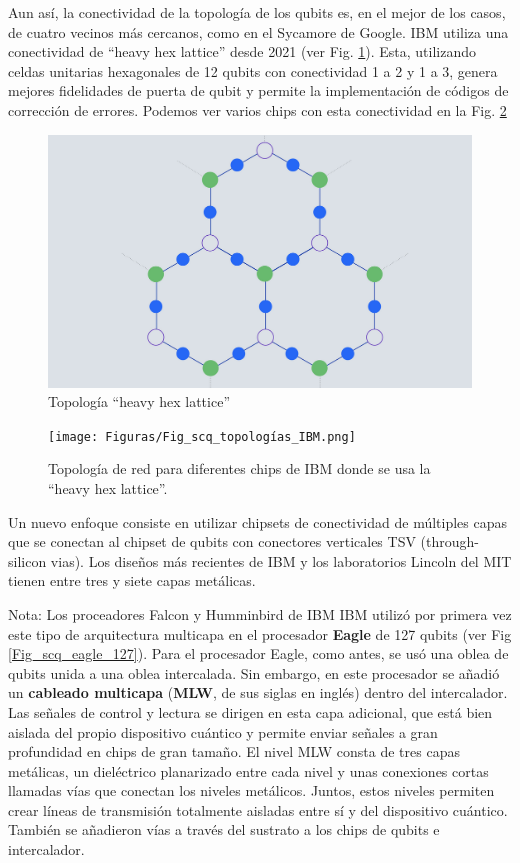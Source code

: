 Aun así, la conectividad de la topología de los qubits es, en el mejor de los casos, de cuatro vecinos más cercanos, como en el Sycamore de Google. IBM utiliza una conectividad de ``heavy hex lattice'' desde 2021 (ver Fig. \ref{Fig_scq_hhl}). Esta, utilizando celdas unitarias hexagonales de 12 qubits con conectividad 1 a 2 y 1 a 3, genera mejores fidelidades de puerta de qubit y permite la implementación de códigos de corrección de errores. Podemos ver varios chips con esta conectividad en la Fig. \ref{Fig_scq_topologías_IBM}

	\begin{figure}[h!]
	\centering 
	\includegraphics[width=0.45\linewidth]{Figuras/Fig_scq_hhl.png}
	\caption{Topología ``heavy hex lattice''}
	\label{Fig_scq_hhl}
	\end{figure}


	\begin{figure}[H]
	\centering 
	\texttt{[image: Figuras/Fig\_scq\_topologías\_IBM.png]}
	\caption{Topología de red para diferentes chips de IBM donde se usa la ``heavy hex lattice''. }
	\label{Fig_scq_topologías_IBM}
	\end{figure}


Un nuevo enfoque consiste en utilizar chipsets de conectividad de múltiples capas que se conectan al chipset de qubits con conectores verticales TSV (through-silicon vias). Los diseños más recientes de IBM y los laboratorios Lincoln del MIT tienen entre tres y siete capas metálicas. 



\begin{mybox_blue}{Nota: Los proceadores Falcon y Humminbird de IBM}
    IBM utilizó por primera vez este tipo de arquitectura multicapa en el procesador \textbf{Eagle} de 127 qubits (ver Fig \ref{Fig_scq_eagle_127}).  Para el procesador Eagle, como antes, se usó una oblea de qubits unida a una oblea intercalada. Sin embargo, en este procesador se añadió un \textbf{cableado multicapa} (\textbf{MLW}, de sus siglas en inglés) dentro del intercalador. Las señales de control y lectura se dirigen en esta capa adicional, que está bien aislada del propio dispositivo cuántico y permite enviar señales a gran profundidad en chips de gran tamaño.  El nivel MLW consta de tres capas metálicas, un dieléctrico planarizado entre cada nivel y unas conexiones cortas llamadas vías que conectan los niveles metálicos. Juntos, estos niveles permiten crear líneas de transmisión totalmente aisladas entre sí y del dispositivo cuántico. También se añadieron vías a través del sustrato a los chips de qubits e intercalador.
\end{mybox_blue}


